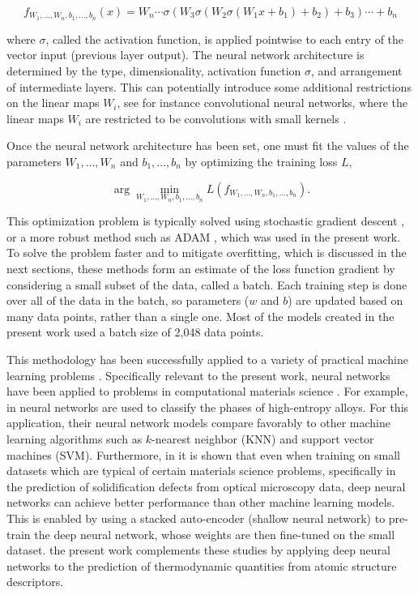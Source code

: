 \begin{equation}
    f_{W_1,...,W_n,b_1,...,b_n}(x) = W_n\cdots\sigma(W_3\sigma(W_2\sigma(W_1x+b_1)+b_2)+b_3)\cdots + b_n
\end{equation}

where $\sigma$, called the activation function, is applied pointwise to each entry of the vector input (previous layer output). The neural network architecture is determined by the type, dimensionality, activation function $\sigma$, and arrangement of intermediate layers. This can potentially introduce some additional restrictions on the linear maps $W_i$, see for instance convolutional neural networks, where the linear maps $W_i$ are restricted to be convolutions with small kernels \cite{krizhevsky2012imagenet,lecun1995comparison,lecun1998gradient}.


Once the neural network architecture has been set, one must fit the values of the parameters $W_1,...,W_n$ and $b_1,...,b_n$ by optimizing the training loss $L$,

\begin{equation}
    \arg\min_{W_1,...,W_n,b_1,...,b_n} L(f_{W_1,...,W_n,b_1,...,b_n}).
\end{equation}

This optimization problem is typically solved using stochastic gradient descent \cite{lecun1998gradient}, or a more robust method such as ADAM \cite{kingma2014adam}, which was used in the present work. To solve the problem faster and to mitigate overfitting, which is discussed in the next sections, these methods form an estimate of the loss function gradient by considering a small subset of the data, called a batch. Each training step is done over all of the data in the batch, so parameters ($w$ and $b$) are updated based on many data points, rather than a single one. Most of the models created in the present work used a batch size of 2,048 data points.

This methodology has been successfully applied to a variety of practical machine learning problems \cite{krizhevsky2012imagenet,goodfellow2013multi,dahl2011context}. Specifically relevant to the present work, neural networks have been applied to problems in computational materials science \cite{Huang2019Machine-learningAlloys,Feng2019UsingDefects}. For example, in \cite{Huang2019Machine-learningAlloys} neural networks are used to classify the phases of high-entropy alloys. For this application, their neural network models compare favorably to other machine learning algorithms such as $k$-nearest neighbor (KNN) and support vector machines (SVM). Furthermore, in \cite{Feng2019UsingDefects} it is shown that even when training on small datasets which are typical of certain materials science problems, specifically in the prediction of solidification defects from optical microscopy data, deep neural networks can achieve better performance than other machine learning models. This is enabled by using a stacked auto-encoder (shallow neural network) to pre-train the deep neural network, whose weights are then fine-tuned on the small dataset. the present work complements these studies by applying deep neural networks to the prediction of thermodynamic quantities from atomic structure descriptors.

